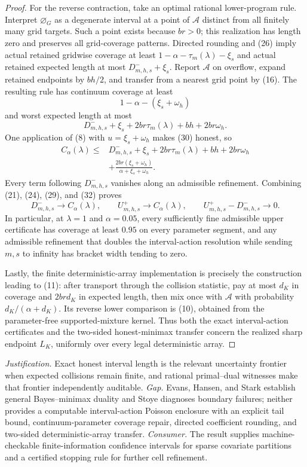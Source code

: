 \documentclass{article}
\begin{document}
\begin{proof}
For the reverse contraction, take an optimal rational lower-program rule.
Interpret \(\varnothing_G\) as a degenerate interval at a point of
\(\mathcal A\) distinct from all finitely many grid targets.  Such a point
exists because \(br>0\); this realization has length zero and preserves
all grid-coverage patterns.  Directed rounding and (26) imply actual
retained gridwise coverage at least
\(1-\alpha-\tau_m(\lambda)-\xi_s\) and actual retained expected length at
most \(D_{m,h,s}^-+\xi_s\).  Report \(\mathcal A\) on overflow, expand
retained endpoints by \(bh/2\), and transfer from a nearest grid point by
(16).  The resulting rule has continuum coverage at least
\[
 1-\alpha-(\xi_s+\omega_h)
 \tag{30}
\]
and worst expected length at most
\[
 D_{m,h,s}^-+\xi_s+2br\tau_m(\lambda)+bh+2br\omega_h.
 \tag{31}
\]
One application of (8) with \(u=\xi_s+\omega_h\) makes (30) honest, so
\[
\begin{aligned}
 C_\alpha(\lambda)
 \leq{}&D_{m,h,s}^-+\xi_s+2br\tau_m(\lambda)+bh+2br\omega_h\\
 &+\frac{2br(\xi_s+\omega_h)}
 {\alpha+\xi_s+\omega_h}.
\end{aligned}
 \tag{32}
\]
Every term following \(D_{m,h,s}^-\) vanishes along an admissible
refinement.  Combining (21), (24), (29), and (32) proves
\[
 D_{m,h,s}^-\longrightarrow C_\alpha(\lambda),\qquad
 U_{m,h,s}^+\longrightarrow C_\alpha(\lambda),\qquad
 U_{m,h,s}^+-D_{m,h,s}^-\longrightarrow0.
 \tag{33}
\]
In particular, at \(\lambda=1\) and \(\alpha=0.05\), every sufficiently
fine admissible upper certificate has coverage at least \(0.95\) on every
parameter segment, and any admissible refinement that doubles the
interval-action resolution while sending \(m,s\) to infinity has bracket
width tending to zero.

Lastly, the finite deterministic-array implementation is precisely the
construction leading to (11): after transport through the collision
statistic, pay at most \(d_K\) in coverage and \(2brd_K\) in expected
length, then mix once with \(\mathcal A\) with probability
\(d_K/(\alpha+d_K)\).  Its reverse lower comparison is (10), obtained from
the parameter-free supported-mixture kernel.  Thus both the exact
interval-action certificates and the two-sided honest-minimax transfer
concern the realized sharp endpoint \(L_K\), uniformly over every legal
deterministic array.
\end{proof}
\par\smallskip\noindent \textit{Justification.} Exact honest interval length is the relevant uncertainty frontier when expected collisions remain finite, and rational primal--dual witnesses make that frontier independently auditable. \textit{Gap.} Evans, Hansen, and Stark establish general Bayes--minimax duality and Stoye diagnoses boundary failures; neither provides a computable interval-action Poisson enclosure with an explicit tail bound, continuum-parameter coverage repair, directed coefficient rounding, and two-sided deterministic-array transfer. \textit{Consumer.} The result supplies machine-checkable finite-information confidence intervals for sparse covariate partitions and a certified stopping rule for further cell refinement.
\end{document}
